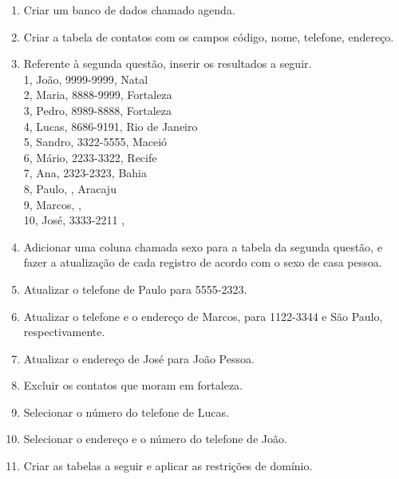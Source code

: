 \documentclass[11pt]{article}
\begin{document}
	\begin{enumerate}
		\item Criar um banco de dados chamado agenda.
		
		\item Criar a tabela de contatos com os campos código, nome, telefone, endereço.
		
		\item Referente à segunda questão, inserir os resultados a seguir.\\
		1, João, 9999-9999, Natal\\
		2, Maria, 8888-9999, Fortaleza\\
		3, Pedro, 8989-8888, Fortaleza\\
		4, Lucas, 8686-9191, Rio de Janeiro\\
		5, Sandro, 3322-5555, Maceió\\
		6, Mário, 2233-3322, Recife\\
		7, Ana, 2323-2323, Bahia\\
		8, Paulo, , Aracaju\\
		9, Marcos, ,\\
		10, José, 3333-2211 ,\\
		
		\item Adicionar uma coluna chamada sexo para a tabela da segunda questão, e fazer a atualização de
		cada registro de acordo com o sexo de casa pessoa.
		
		\item Atualizar o telefone de Paulo para 5555-2323.
		
		\item Atualizar o telefone e o endereço de Marcos, para 1122-3344 e São Paulo, respectivamente.
		
		\item Atualizar o endereço de José para João Pessoa.
		
		\item Excluir os contatos que moram em fortaleza.
		
		\item Selecionar o número do telefone de Lucas.
		
		\item Selecionar o endereço e o número do telefone de João.
		
		\item Criar as tabelas a seguir e aplicar as restrições de domínio.
		

\end{enumerate}
\end{document}
